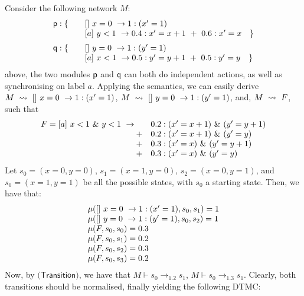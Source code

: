 \begin{example}
  Consider the following network $M$:
  \begin{displaymath}
    \begin{array}{llll}
      \role{p}: \{ & \quad \commandBase {}{x=0} {1:(x'=1)}\\
                   & \quad \commandBase {a}{y<1} {0.4: x'=x+1\ +\ 0.6: x'=x}\quad \}\\[2mm]
      \role{q}: \{ & \quad \commandBase {}{y=0} {1:(y'=1)}\\
                   & \quad \commandBase {a}{x<1} {0.5: y'=y+1\ +\ 0.5: y'=y}\quad \}\\
    \end{array}
  \end{displaymath}
  above, the two modules $\mathsf{p}$ and $\mathsf{q}$ can both do
  independent actions, as well as synchronising on label $a$. Applying
  the semantics, we can easily derive
  $M\ \stackrel{}{\rightsquigarrow}\ []\ x=0\ \rightarrow 1:(x'=1)$,
  $M\ \stackrel{}{\rightsquigarrow}\ []\ y=0\ \rightarrow 1:(y'=1)$, and, $M\ \stackrel{}{\rightsquigarrow}\ F$,
  such that
  \begin{displaymath}
    \begin{array}{rlll}
      F=\commandBase {a}{x<1\ \&\ y<1} {\quad} & 0.2: (x'=x+1)\ \&\ (y'=y+1)\\
                                       + & 0.2: (x'=x+1)\ \&\ (y'=y)\\
                                       + & 0.3: (x'=x)\ \&\ (y'=y+1)\\
                                       + & 0.3: (x'=x)\ \&\ (y'=y)\\
    \end{array}
  \end{displaymath}  
  Let $s_0=(x=0,y=0)$, $s_1=(x=1,y=0)$, $s_2=(x=0,y=1)$, and
  $s_0=(x=1,y=1)$ be all the possible states, with $s_0$ a starting
  state. Then,  we have that: 
  \begin{displaymath}
    \begin{array}{lll}
      \mu([]\ x=0\ \rightarrow 1:(x'=1), s_0, s_1) = 1\\
      \mu([]\ y=0\ \rightarrow 1:(y'=1), s_0, s_2) = 1\\
      \mu(F, s_0, s_0) = 0.3\\
      \mu(F, s_0, s_1) = 0.2\\
      \mu(F, s_0, s_2) = 0.3\\
      \mu(F, s_0, s_3) = 0.2
    \end{array}
  \end{displaymath}  
  Now, by $\textsf{(Transition)}$, we have that
  $M\vdash s_0\rightarrow_{1.2} s_1$,
  $M\vdash s_0\rightarrow_{1.3} s_1$. Clearly, both transitions should
  be normalised, finally yielding the following DTMC:


\end{example}
